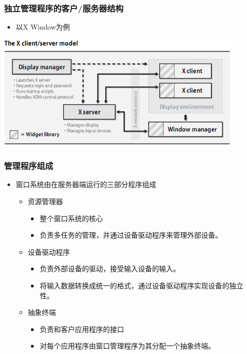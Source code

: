 \documentclass{beamer}
\begin{document}
\begin{frame}
	\frametitle{独立管理程序的客户/服务器结构}
	\begin{itemize}
	\item 以X Window为例
	\end{itemize}
	\begin{center}
	\includegraphics[width=0.9\textwidth]{images/x-server-architecture.png}
	\end{center}
\end{frame}

\begin{frame}
	\frametitle{管理程序组成}
	\beamertemplatetransparentcovereddynamicmedium
	\begin{itemize}
		\item 窗口系统由在服务器端运行的三部分程序组成
		\pause
		\begin{itemize}
			\item 资源管理器
			\begin{itemize}
				\item 整个窗口系统的核心
				\item 负责多任务的管理，并通过设备驱动程序来管理外部设备。
			\end{itemize}
			\pause
			\item 设备驱动程序
			\begin{itemize}
				\item 负责外部设备的驱动，接受输入设备的输入。
				\item 将输入数据转换成统一的格式，通过设备驱动程序实现设备的独立性。
			\end{itemize}
			\pause
			\item 抽象终端
			\begin{itemize}
				\item 负责和客户应用程序的接口
				\item 对每个应用程序由窗口管理程序为其分配一个抽象终端。
			\end{itemize}
		\end{itemize}
	\end{itemize}
\end{frame}
\end{document}
